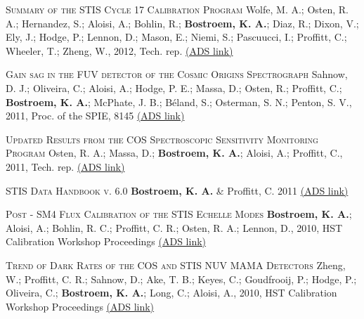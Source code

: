 \begin{revnumerate}[24]
\item{\textsc{Summary of the STIS Cycle 17 Calibration Program}
Wolfe, M. A.; Osten, R. A.; Hernandez, S.; Aloisi, A.; Bohlin, R.; \textbf{Bostroem, K. A.}; Diaz, R.; Dixon, V.; Ely, J.; Hodge, P.; Lennon, D.; Mason, E.; Niemi, S.; Pascuucci, I.; Proffitt, C.; Wheeler, T.; Zheng, W., 2012, Tech. rep. 
\color{blue}\href{https://ui.adsabs.harvard.edu/#abs/2012stis.rept....3W/abstract}{(ADS link)}\color{black}}\\%

\item{\textsc{Gain sag in the FUV detector of the Cosmic Origins Spectrograph}
Sahnow, D. J.; Oliveira, C.; Aloisi, A.; Hodge, P. E.; Massa, D.; Osten, R.; Proffitt, C.; \textbf{Bostroem, K. A.}; McPhate, J. B.; B\'{e}land, S.; Osterman, S. N.; Penton, S. V., 2011,  Proc. of the SPIE, 8145 
\color{blue}\href{https://ui.adsabs.harvard.edu/#abs/2011SPIE.8145E..0QS/abstract}{(ADS link)}\color{black}}\\ %

\item{\textsc{Updated Results from the COS Spectroscopic Sensitivity Monitoring Program} 
Osten, R. A.; Massa, D.; \textbf{Bostroem, K. A.}; Aloisi, A.; Proffitt, C., 2011, Tech. rep. 
\color{blue}\href{https://ui.adsabs.harvard.edu/#abs/2011cos..rept....2O/abstract}{(ADS link)}\color{black}}\\ %

\item{\textsc{STIS Data Handbook v. 6.0} 
{\bf Bostroem, K. A.} \& Proffitt, C. 2011
\color{blue}\href{https://ui.adsabs.harvard.edu/#abs/2011stis.book.....B/abstract}{(ADS link)}\color{black}}\\

\item{\textsc{Post - SM4 Flux Calibration of the STIS Echelle Modes} 
\textbf{Bostroem, K. A.}; Aloisi, A.; Bohlin, R. C.; Proffitt, C. R.; Osten, R. A.; Lennon, D., 2010, HST Calibration Workshop Proceedings
\color{blue}\href{https://ui.adsabs.harvard.edu/#abs/2010hstc.workE..51B/abstract}{(ADS link)}\color{black}}\\%

\item{\textsc{Trend of Dark Rates of the COS and STIS NUV MAMA Detectors} 
Zheng, W.; Proffitt, C. R.; Sahnow, D.; Ake, T. B.; Keyes, C.; Goudfrooij, P.; Hodge, P.; Oliveira, C.; \textbf{Bostroem, K. A.}; Long, C.; Aloisi, A., 2010, HST Calibration Workshop Proceedings 
\color{blue}\href{https://ui.adsabs.harvard.edu/#abs/2010hstc.workE..47Z/abstract}{(ADS link)}\color{black}}\\


\end{revnumerate}

